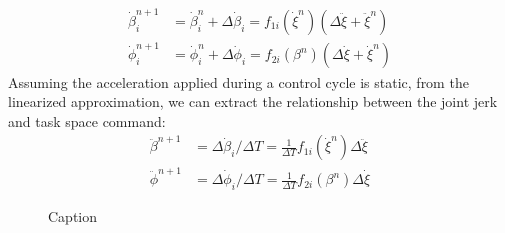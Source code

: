 \begin{equation}\label{eq:firstOrderApp}
\begin{split}
\dot{\beta}_i^{n+1}&=\dot{\beta}_i^n + \Delta\dot{\beta}_i=f_{1i}(\dot{\xi}^n)(\Delta\ddot{\xi}+\ddot{\xi}^n)\\
\dot{\phi}_i^{n+1}&=\dot{\phi}_i^n + \Delta\dot{\phi}_i=f_{2i}(\beta^n)(\Delta\dot{\xi}+\dot{\xi}^n)
\end{split}
\end{equation}
Assuming the acceleration applied during a control cycle is static, from the linearized approximation, we can extract the relationship between the joint jerk and task space command:
\begin{equation}\label{eq:deltaRelation}
    \begin{split}
        \ddot{\beta}^{n+1}&=\Delta\dot{\beta}_i/\Delta T=\frac{1}{\Delta T}f_{1i}(\dot{\xi}^n)\Delta\ddot{\xi}\\
        \ddot{\phi}^{n+1}&=\Delta\dot{\phi}_i/\Delta T=\frac{1}{\Delta T}f_{2i}(\beta^n)\Delta\dot{\xi}
    \end{split}
\end{equation}


\begin{figure}
    \centering
    \caption{Caption}
    \label{fig:deltaXi}
\end{figure}  


